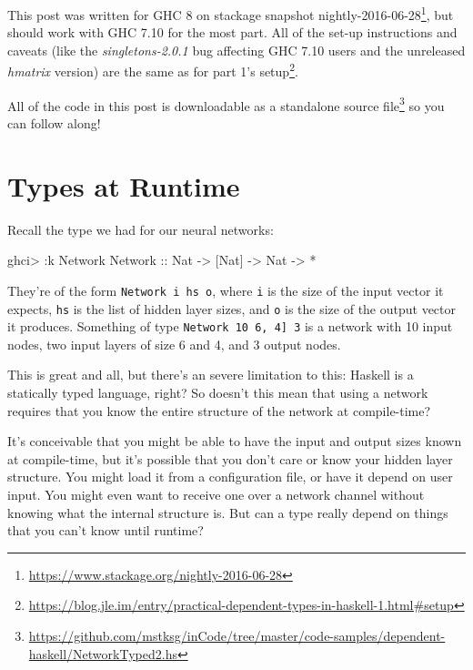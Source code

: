 \documentclass[]{article}
\newenvironment{Shaded}{}{}
\newcommand{\DataTypeTok}[1]{\textcolor[rgb]{0.56,0.13,0.00}{{#1}}}
\newcommand{\OtherTok}[1]{\textcolor[rgb]{0.00,0.44,0.13}{{#1}}}
\newcommand{\FunctionTok}[1]{\textcolor[rgb]{0.02,0.16,0.49}{{#1}}}
\newcommand{\NormalTok}[1]{{#1}}
\renewcommand{\href}[2]{#2\footnote{\url{#1}}}
\begin{document}
This post was written for GHC 8 on stackage snapshot
\href{https://www.stackage.org/nightly-2016-06-28}{nightly-2016-06-28}, but
should work with GHC 7.10 for the most part. All of the set-up instructions and
caveats (like the \emph{singletons-2.0.1} bug affecting GHC 7.10 users and the
unreleased \emph{hmatrix} version) are the same as for
\href{https://blog.jle.im/entry/practical-dependent-types-in-haskell-1.html\#setup}{part
1's setup}.

All of the code in this post is
\href{https://github.com/mstksg/inCode/tree/master/code-samples/dependent-haskell/NetworkTyped2.hs}{downloadable
as a standalone source file} so you can follow along!

\section{Types at Runtime}\label{types-at-runtime}

Recall the type we had for our neural networks:

\begin{Shaded}
\begin{Highlighting}[]
\NormalTok{ghci}\FunctionTok{>} \FunctionTok{:}\NormalTok{k }\DataTypeTok{Network}
\DataTypeTok{Network}\OtherTok{ ::} \DataTypeTok{Nat} \OtherTok{->} \NormalTok{[}\DataTypeTok{Nat}\NormalTok{] }\OtherTok{->} \DataTypeTok{Nat} \OtherTok{->} \FunctionTok{*}
\end{Highlighting}
\end{Shaded}

They're of the form \texttt{Network\ i\ hs\ o}, where \texttt{i} is the size of
the input vector it expects, \texttt{hs} is the list of hidden layer sizes, and
\texttt{o} is the size of the output vector it produces. Something of type
\texttt{Network\ 10\ \textquotesingle{}{[}6,\ 4{]}\ 3} is a network with 10
input nodes, two input layers of size 6 and 4, and 3 output nodes.

This is great and all, but there's an severe limitation to this: Haskell is a
statically typed language, right? So doesn't this mean that using a network
requires that you know the entire structure of the network at compile-time?

It's conceivable that you might be able to have the input and output sizes known
at compile-time, but it's possible that you don't care or know your hidden layer
structure. You might load it from a configuration file, or have it depend on
user input. You might even want to receive one over a network channel without
knowing what the internal structure is. But can a type really depend on things
that you can't know until runtime?
\end{document}
